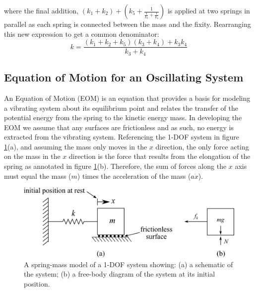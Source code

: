 \documentclass[12pt,letter]{article}
\begin{document}
\begin{example}
				\noindent where the final addition, $(k_1+k_2) + (k_5+\frac{1}{\frac{1}{k_3}+\frac{1}{k_4}})$ is applied at two springs in parallel as each spring is connected between the mass and the fixity. Rearranging this new expression to get a common denominator:
				\begin{equation}
					k= \frac{(k_1+k_2+k_5)(k_3+k_4)+k_3k_4}{k_3+k_4}  
				\end{equation}				
			\end{example}	

					
	\subsection{Equation of Motion for an Oscillating System}			
			
        An Equation of Motion (EOM) is an equation that provides a basis for modeling a vibrating system about its equilibrium point and relates the transfer of the potential energy from the spring to the kinetic energy mass. In developing the EOM we assume that any surfaces are frictionless and as such, no energy is extracted from the vibrating system. Referencing the 1-DOF system in figure \ref{fig:EOM_1-DOF-mass_horizontal}(a), and assuming the mass only moves in the $x$ direction, the only force acting on the mass in the $x$ direction is the force that results from the elongation of the spring as annotated in figure \ref{fig:EOM_1-DOF-mass_horizontal}(b). Therefore, the sum of forces along the $x$ axis must equal the mass ($m$) times the acceleration of the mass ($a\dot{x}$). 

		\begin{figure}[H]
			\centering
			\includegraphics[]{../figures/EOM_1-DOF-mass_horizontal.png}
			\caption{A spring-mass model of a 1-DOF system showing: (a) a schematic of the system; (b) a free-body diagram of the system at its initial position.}
			\label{fig:EOM_1-DOF-mass_horizontal}
		\end{figure}			
		
\end{document}

